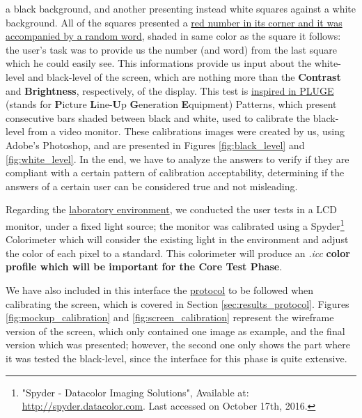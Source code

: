 a black background, and another presenting instead white squares against a white background. All of the squares presented a \ul{red number in its
corner and it was accompanied by a random word}, shaded in same color as the square it follows: the user's task was to provide us the number (and
word) from the last square which he could easily see. This informations provide us input about the white-level and black-level of the screen, which
are nothing more than the \textbf{Contrast} and \textbf{Brightness}, respectively, of the display. This test is \ul{inspired in PLUGE} (stands for \textbf{P}icture
\textbf{L}ine-\textbf{U}p \textbf{G}eneration \textbf{E}quipment) Patterns, which present consecutive bars shaded between black and white, used to calibrate the black-level from a video
monitor. These calibrations images were created by us, using Adobe's Photoshop, and are presented in Figures \ref{fig:black_level} and
\ref{fig:white_level}. In the end, we have to analyze the answers to verify if they are compliant with a certain pattern of calibration acceptability,
determining if the answers of a certain user can be considered true and not misleading. \par
%
Regarding the \ul{laboratory environment}, we conducted the user tests in a LCD monitor, under a fixed light source; the monitor was calibrated
using a Spyder\footnote{"Spyder - Datacolor Imaging Solutions", Available at: \url{http://spyder.datacolor.com}. Last accessed on October 17th, 2016.}
Colorimeter which will consider the existing light in the environment and adjust the color of each pixel to a standard. This colorimeter will produce an
\emph{.icc} \textbf{color profile which will be important for the Core Test Phase}. \par
%
We have also included in this interface the \ul{protocol} to be followed when calibrating the screen, which is covered in Section \ref{sec:results_protocol}.
Figures \ref{fig:mockup_calibration} and \ref{fig:screen_calibration} represent the wireframe version of the screen, which only contained one image as
example, and the final version which was presented; however, the second one only shows the part where it was tested the black-level, since the interface
for this phase is quite extensive. \par
%
